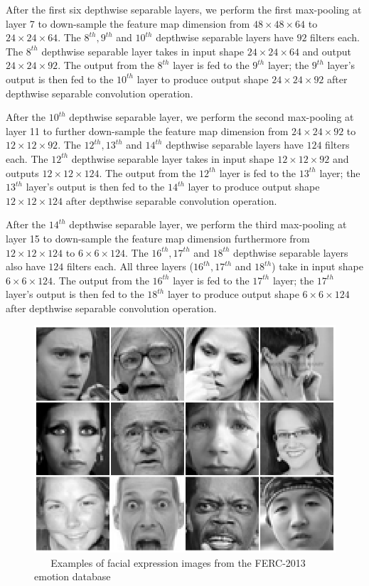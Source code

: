\documentclass[master]{thesis-uestc}
\begin{document}
After the first six depthwise separable layers, we perform the first max-pooling at layer 7 to down-sample the feature map dimension from $48 \times 48 \times 64$ to $24 \times 24 \times 64$. The $8^{th}, 9^{th}$ and $10^{th}$ depthwise separable layers have $92$ filters each. The $8^{th}$ depthwise separable layer takes in input shape $24 \times 24 \times 64$ and output $24 \times 24 \times 92$. The output from the $8^{th}$ layer is fed to the $9^{th}$ layer; the $9^{th}$ layer's output is then fed to the $10^{th}$ layer to produce output shape $24 \times 24 \times 92$ after depthwise separable convolution operation.

After the $10^{th}$ depthwise separable layer, we perform the second max-pooling at layer 11 to further down-sample the feature map dimension from $24 \times 24 \times 92$ to $12 \times 12 \times 92$. The $12^{th}, 13^{th}$ and $14^{th}$ depthwise separable layers have $124$ filters each. The $12^{th}$ depthwise separable layer takes in input shape $12 \times 12 \times 92$ and outputs $12 \times 12 \times 124$. The output from the $12^{th}$ layer is fed to the $13^{th}$ layer; the $13^{th}$ layer's output is then fed to the $14^{th}$ layer to produce output shape $12 \times 12 \times 124$ after depthwise separable convolution operation.

After the $14^{th}$ depthwise separable layer, we perform the third max-pooling at layer 15 to down-sample the feature map dimension furthermore from $12 \times 12 \times 124$ to $6 \times 6 \times 124$. The $16^{th}, 17^{th}$ and $18^{th}$ depthwise separable layers also have $124$ filters each. All three layers ($16^{th}, 17^{th}$ and $18^{th}$) take in input shape $6 \times 6 \times 124$. The output from the $16^{th}$ layer is fed to the $17^{th}$ layer; the $17^{th}$ layer's output is then fed to the $18^{th}$ layer to produce output shape $6 \times 6 \times 124$ after depthwise separable convolution operation.

\begin{figure}[ht]
\includegraphics[width=5in]{pic/fer2013.png}
\caption{\,\,\,\,\,\,\,\,\,\,Examples of facial expression images from the FERC-2013 emotion database}
\label{fer2013_images}
\end{figure}
\end{document}
